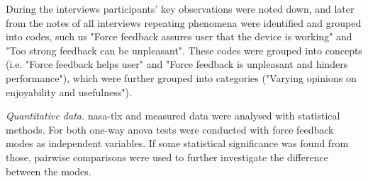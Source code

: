 During the interviews participants' key observations were noted down, and later from the notes of all interviews repeating phenomena were identified and grouped into codes, such us "Force feedback assures user that the device is working" and "Too strong feedback can be unpleasant". These codes were grouped into concepts (i.e. "Force feedback helps user" and "Force feedback is unpleasant and hinders performance"), which were further grouped into categories ("Varying opinions on enjoyability and usefulness").

\textit{Quantitative data.} \gls{nasa-tlx} and measured data were analysed with statistical methods. For both one-way \gls{anova} tests were conducted with force feedback modes as independent variables. If some statistical significance was found from those, pairwise comparisons were used to further investigate the difference between the modes.